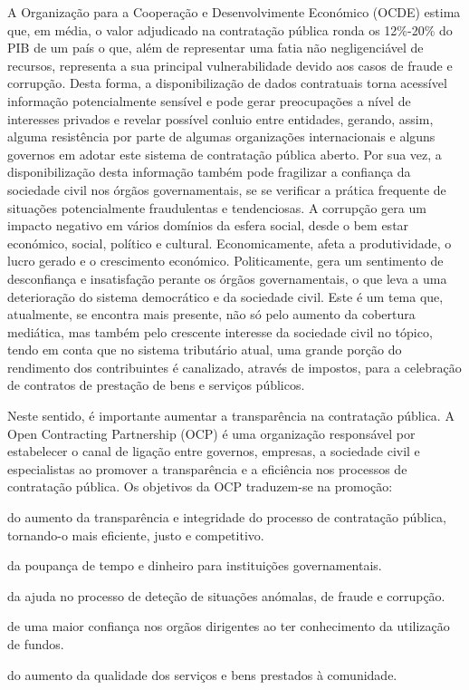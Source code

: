 A Organização para a Cooperação e Desenvolvimente Económico (OCDE) estima que, em média, o valor adjudicado na contratação pública ronda os 12\%-20\% do PIB de um país o que, além de representar uma fatia não negligenciável de recursos, representa a sua principal vulnerabilidade devido aos casos de fraude e corrupção\cite{ocp_brief}\cite{redflags_guide}. Desta forma, a disponibilização de dados contratuais torna acessível informação potencialmente sensível e pode gerar preocupações a nível de interesses privados e revelar possível conluio entre entidades, gerando, assim, alguma resistência por parte de algumas organizações internacionais e alguns governos em adotar este sistema de contratação pública aberto. Por sua vez, a disponibilização desta informação também pode fragilizar a confiança da sociedade civil nos órgãos governamentais, se se verificar a prática frequente de situações potencialmente fraudulentas e tendenciosas\cite{stateogp}.  A corrupção gera um impacto negativo em vários domínios da esfera social, desde o bem estar económico, social, político e cultural. Economicamente, afeta a produtividade, o lucro gerado e o crescimento económico. Politicamente, gera um sentimento de desconfiança e insatisfação perante os órgãos governamentais, o que leva a uma deterioração do sistema democrático e da sociedade civil. Este é um tema que, atualmente, se encontra mais presente, não só pelo aumento da cobertura mediática, mas também pelo crescente interesse da sociedade civil no tópico\cite{crime}, tendo em conta que no sistema tributário atual, uma grande porção do rendimento dos contribuintes é canalizado, através de impostos, para a celebração de contratos de prestação de bens e serviços públicos. 

Neste sentido, é importante aumentar a transparência na contratação pública. A Open Contracting Partnership (OCP) é uma organização responsável por estabelecer o canal de ligação entre governos, empresas, a sociedade civil e especialistas ao promover a transparência e a eficiência nos processos de contratação pública. Os objetivos da OCP traduzem-se na promoção\cite{redflags_guide}\cite{stateogp}:

\begin{my_itemize}
	
	\item do aumento da transparência e integridade do processo de contratação pública, tornando-o mais eficiente, justo e competitivo.
	
	\item da poupança de tempo e dinheiro para instituições governamentais.
	
	\item da ajuda no processo de deteção de situações anómalas, de fraude e corrupção.
	
	\item de uma maior confiança nos orgãos dirigentes ao ter conhecimento da utilização de fundos.
	
	\item do aumento da qualidade dos serviços e bens prestados à comunidade.
	
\end{my_itemize}


